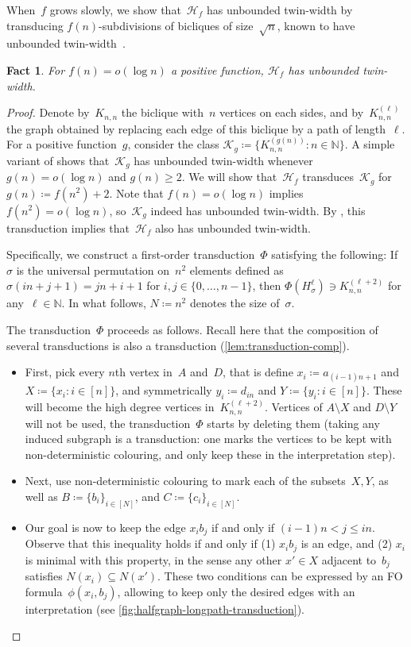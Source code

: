 \documentclass[a4paper,UKenglish,cleveref,thm-restate]{lipics-v2021}
\newtheorem{fact}[theorem]{Fact}
\theoremstyle{remark}
\newcommand{\eqdef}{\coloneqq}
\newcommand{\Hc}{\mathcal{H}}
\newcommand{\Kc}{\mathcal{K}}
\newcommand{\N}{\mathbb{N}}
\begin{document}
When~$f$ grows slowly, we show that~$\Hc_f$ has unbounded twin-width by transducing $f(n)$-subdivisions of bicliques of size~$\sqrt{n}$, known to have unbounded twin-width~\cite{twin-width2}.%
\begin{fact}\label{fact:logn-subdiv-tww}
    For $f(n) = o(\log n)$ a positive function, $\Hc_f$ has unbounded twin-width.
\end{fact}
\begin{proof}
    Denote by~$K_{n,n}$ the biclique with~$n$ vertices on each sides,
    and by~$K_{n,n}^{(\ell)}$ the graph obtained by replacing each edge of this biclique by a path of length~$\ell$.
    For a positive function~$g$, consider the class $\Kc_g \eqdef \{K_{n,n}^{(g(n))} : n \in \N\}$.
    A simple variant of \cite[Theorem~6.2]{twin-width2} shows that~$\Kc_g$ has unbounded twin-width whenever $g(n) = o(\log n)$ and $g(n) \ge 2$.
    We will show that~$\Hc_f$ transduces~$\Kc_g$ for $g(n) \eqdef f(n^2)+2$.
    Note that $f(n) = o(\log n)$ implies $f(n^2) = o(\log n)$, so~$\Kc_g$ indeed has unbounded twin-width.
    By \cite[Theorem~8.1]{Bonnet2022twinwidth1}, this transduction implies that~$\Hc_f$ also has unbounded twin-width.

    Specifically, we construct a first-order transduction~$\Phi$ satisfying the following:
    If~$\sigma$ is the universal permutation on~$n^2$ elements defined as $\sigma(in+j+1) = jn+i+1$ for $i,j \in \{0,\dots,n-1\}$,
    then $\Phi(H_\sigma^\ell) \ni K_{n,n}^{(\ell+2)}$ for any~$\ell \in \N$.
    In what follows, $N \eqdef n^2$ denotes the size of~$\sigma$.
    
    The transduction~$\Phi$ proceeds as follows. Recall here that the composition of several transductions is also a transduction (\cref{lem:transduction-comp}).
    \begin{itemize}
        \item First, pick every $n$th vertex in~$A$ and~$D$,
        that is define $x_i \eqdef a_{(i-1)n+1}$ and $X \eqdef \{x_i : i \in [n]\}$,
        and symmetrically $y_i \eqdef d_{in}$ and $Y \eqdef \{y_i : i \in [n]\}$.
        These will become the high degree vertices in~$K_{n,n}^{(\ell+2)}$.
        Vertices of $A \setminus X$ and $D \setminus Y$ will not be used, the transduction~$\Phi$ starts by deleting them
        (taking any induced subgraph is a transduction: one marks the vertices to be kept with non-deterministic colouring, and only keep these in the interpretation step).
        \item Next, use non-deterministic colouring to mark each of the subsets~$X,Y$, as well as $B \eqdef \{b_i\}_{i \in [N]}$, and $C \eqdef \{c_i\}_{i \in [N]}$.
        \item Our goal is now to keep the edge $x_i b_j$ if and only if $(i-1)n < j \le in$.
        Observe that this inequality holds if and only if (1) $x_i b_j$ is an edge, and (2) $x_i$ is minimal with this property,
        in the sense any other $x' \in X$ adjacent to~$b_j$ satisfies $N(x_i) \subseteq N(x')$.
        These two conditions can be expressed by an FO formula~$\phi(x_i,b_j)$, allowing to keep only the desired edges with an interpretation (see \cref{fig:halfgraph-longpath-transduction}).


\end{itemize}
\end{proof}
\end{document}
